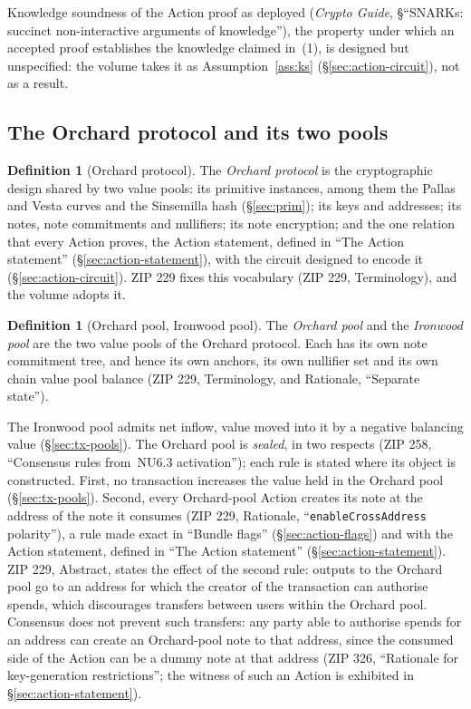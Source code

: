 \documentclass[11pt,a4paper]{article}
\theoremstyle{definition}
\newtheorem{definition}[theorem]{Definition}
\begin{document}
Knowledge soundness of the Action proof as deployed (\emph{Crypto Guide},
\S``SNARKs: succinct non-interactive arguments of knowledge''), the property
under which an accepted proof establishes the knowledge claimed in~(1), is
designed but unspecified: the volume takes it as
Assumption~\ref{ass:ks} (\S\ref{sec:action-circuit}), not as a result.

\subsection{The Orchard protocol and its two pools}\label{sec:intro-pools}

\begin{definition}[Orchard protocol]
The \emph{Orchard protocol} is the cryptographic design shared by two value
pools: its primitive instances, among them the Pallas and Vesta curves and
the Sinsemilla hash (\S\ref{sec:prim}); its keys and addresses; its notes,
note commitments and nullifiers; its note encryption; and the one relation
that every Action proves, the Action statement, defined in ``The Action
statement'' (\S\ref{sec:action-statement}), with the circuit designed to
encode it (\S\ref{sec:action-circuit}). ZIP 229 fixes this vocabulary
(ZIP 229, Terminology), and the volume adopts it.
\end{definition}

\begin{definition}[Orchard pool, Ironwood pool]
The \emph{Orchard pool} and the \emph{Ironwood pool} are the two value pools
of the Orchard protocol. Each has its own note commitment tree, and hence
its own anchors, its own nullifier set and its own chain value pool balance
(ZIP 229, Terminology, and Rationale, ``Separate state'').
\end{definition}

The Ironwood pool admits net inflow, value moved into it by a negative balancing
value (\S\ref{sec:tx-pools}). The Orchard pool is \emph{sealed}, in two respects
(ZIP 258, ``Consensus rules from~NU6.3 activation''); each rule is stated where
its object is constructed. First, no transaction increases the value held in the
Orchard pool (\S\ref{sec:tx-pools}). Second, every Orchard-pool Action creates
its note at the address of the note it consumes (ZIP 229, Rationale,
``\texttt{enableCrossAddress} polarity''), a rule made exact in ``Bundle flags''
(\S\ref{sec:action-flags}) and with the Action statement, defined in ``The
Action statement'' (\S\ref{sec:action-statement}). ZIP 229, Abstract, states the
effect of the second rule: outputs to the Orchard pool go to an address for
which the creator of the transaction can authorise spends, which discourages
transfers between users within the Orchard pool. Consensus does not prevent such
transfers: any party able to authorise spends for an address can create an
Orchard-pool note to that address, since the consumed side of the Action can be
a dummy note at that address (ZIP 326, ``Rationale for key-generation
restrictions''; the witness of such an Action is exhibited in
\S\ref{sec:action-statement}).
\end{document}
